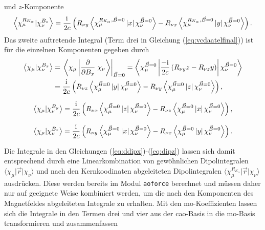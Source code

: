 	und $z$-Komponente	
	\begin{equation}
	\left\langle\chi_\mu^{R_{K_\alpha}}\vert\chi_\nu^{B_z}\right\rangle=\frac{\mathrm{i}\mkern1mu}{2c}\left(R_{\nu y}\left\langle\chi_\mu^{R_{K_\alpha},\vec{B}=0}\left|x\right|\chi_\nu^{\vec{B}=0}\right\rangle-R_{\nu x}\left\langle\chi_\mu^{R_{K_\alpha},\vec{B}=0}\left|y\right|\chi_\nu^{\vec{B}=0}\right\rangle\right).
	\end{equation}
	Das zweite auftretende Integral (Term drei in Gleichung (\ref{eq:vcdaatelfinal})) ist für die einzelnen Komponenten gegeben durch	
	\begin{equation}
	\begin{aligned}
	  \left\langle\chi_\mu\vert\chi_\nu^{B_x}\right\rangle&=\left.\left\langle\chi_\mu\left|\frac{\partial}{\partial B_x}\right.\chi_\nu\right\rangle\right|_{\vec{B}=0}=\left\langle\chi_\mu^{\vec{B}=0}\left|\frac{-\mathrm{i}\mkern1mu}{2c}\left(R_{\nu y}z-R_{\nu z}y\right)\right|\chi_\nu^{\vec{B}=0}\right\rangle\\
	  &=\frac{\mathrm{i}\mkern1mu}{2c}\left(R_{\nu z}\left\langle\chi_\mu^{\vec{B}=0}\left|y\right|\chi_\nu^{\vec{B}=0}\right\rangle-R_{\nu y}\left\langle\chi_\mu^{\vec{B}=0}\left|z\right|\chi_\nu^{\vec{B}=0}\right\rangle\right),
	\end{aligned}
	\end{equation}
 
		\begin{equation}
	  \left\langle\chi_\mu\vert\chi_\nu^{B_y}\right\rangle=\frac{\mathrm{i}\mkern1mu}{2c}\left(R_{\nu x}\left\langle\chi_\mu^{\vec{B}=0}\left|z\right|\chi_\nu^{\vec{B}=0}\right\rangle-R_{\nu z}\left\langle\chi_\mu^{\vec{B}=0}\left|x\right|\chi_\nu^{\vec{B}=0}\right\rangle\right),
	\end{equation}
	
		\begin{equation} \label{eq:dipz}
	  \left\langle\chi_\mu\vert\chi_\nu^{B_z}\right\rangle=\frac{\mathrm{i}\mkern1mu}{2c}\left(R_{\nu y}\left\langle\chi_\mu^{\vec{B}=0}\left|x\right|\chi_\nu^{\vec{B}=0}\right\rangle-R_{\nu x}\left\langle\chi_\mu^{\vec{B}=0}\left|y\right|\chi_\nu^{\vec{B}=0}\right\rangle\right).
	\end{equation}

	

	Die Integrale in den Gleichungen (\ref{eq:ddipx})-(\ref{eq:dipz}) lassen sich damit entsprechend durch eine Linearkombination von gewöhnlichen Dipolintegralen $\langle\chi_\mu\vert\vec{r}\vert\chi_\nu\rangle$ und nach den Kernkoodinaten abgeleiteten Dipolintegralen $\langle\chi_\mu^{R_{K_\alpha}}\vert\vec{r}\vert\chi_\nu\rangle$ ausdrücken. Diese werden bereits im Modul \texttt{aoforce} berechnet und müssen daher nur auf geeignete Weise kombiniert werden, um die nach den Komponenten des Magnetfeldes abgeleiteten Integrale zu erhalten. Mit den \ac{mo}-Koeffizienten lassen sich die Integrale in den Termen drei und vier aus der \ac{cao}-Basis in die \ac{mo}-Basis transformieren und zusammenfassen\supercite{nicu2008vibrational}
	
